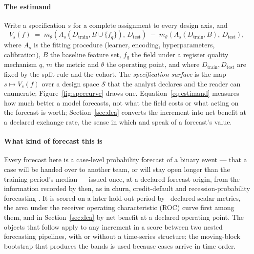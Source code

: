 \paragraph{The estimand}
Write a specification $s$ for a complete assignment to every design axis, and
\begin{equation}
V_s(f) \;=\; m_\theta\!\left(A_s(D_{\mathrm{train}}, B \cup \{f_q\}),\,
D_{\mathrm{test}}\right)
\;-\;
m_\theta\!\left(A_s(D_{\mathrm{train}}, B),\, D_{\mathrm{test}}\right),
\label{eq:estimand}
\end{equation}
where $A_s$ is the fitting procedure (learner, encoding, hyperparameters,
calibration), $B$ the baseline feature set, $f_q$ the field under a register
quality mechanism $q$, $m$ the metric and $\theta$ the operating point, and
where $D_{\mathrm{train}}, D_{\mathrm{test}}$ are fixed by the split rule and
the cohort. The \emph{specification surface} is the map
$s \mapsto V_s(f)$ over a design space $\mathcal{S}$ that the analyst declares
and the reader can enumerate; Figure~\ref{fig:speccurve} draws one.
Equation~\eqref{eq:estimand} measures how much better a model forecasts, not what the
field costs or what acting on the forecast is worth; Section~\ref{sec:dca}
converts the increment into net benefit at a declared exchange rate, the
sense in which \citet{murphy1993good} and \citet{granger2000economic} speak of
a forecast's value.

\paragraph{What kind of forecast this is}
Every forecast here is a case-level probability forecast of a binary event
--- that a case will be handed over to another team, or will stay open longer
than the training period's median --- issued once, at a declared forecast
origin, from the information recorded by then, as in churn, credit-default
and recession-probability forecasting \citep{liu2016recessions}. It is scored
on a later hold-out period by \nInstruments\ declared scalar metrics, the area
under the receiver operating characteristic (ROC) curve first among them, and in Section~\ref{sec:dca} by net
benefit at a declared operating point. The objects that follow apply to any
increment in a score between two nested forecasting pipelines, with or
without a time-series structure; the moving-block bootstrap that produces the
bands is used because cases arrive in time order.

